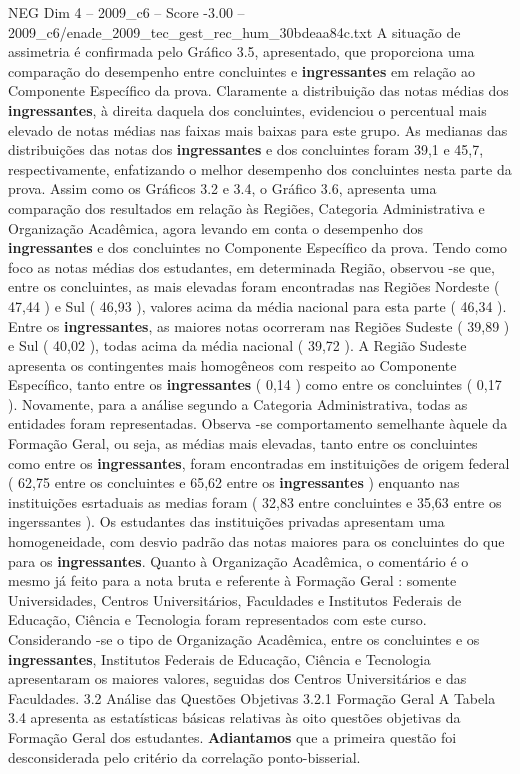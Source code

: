 \begin{textsample}{NEG Dim 4 – 2009\_c6 – Score -3.00 – 2009\_c6/enade\_2009\_tec\_gest\_rec\_hum\_30bdeaa84c.txt}
A situação de assimetria é confirmada pelo Gráfico 3.5, apresentado, que proporciona uma comparação do desempenho entre concluintes e \textbf{ingressantes} em relação ao Componente Específico da prova.
Claramente a distribuição das notas médias dos \textbf{ingressantes}, à direita daquela dos concluintes, evidenciou o percentual mais elevado de notas médias nas faixas mais baixas para este grupo.
As medianas das distribuições das notas dos \textbf{ingressantes} e dos concluintes foram 39,1 e 45,7, respectivamente, enfatizando o melhor desempenho dos concluintes nesta parte da prova.
Assim como os Gráficos 3.2 e 3.4, o Gráfico 3.6, apresenta uma comparação dos resultados em relação às Regiões, Categoria Administrativa e Organização Acadêmica, agora levando em conta o desempenho dos \textbf{ingressantes} e dos concluintes no Componente Específico da prova.
Tendo como foco as notas médias dos estudantes, em determinada Região, observou -se que, entre os concluintes, as mais elevadas foram encontradas nas Regiões Nordeste ( 47,44 ) e Sul ( 46,93 ), valores acima da média nacional para esta parte ( 46,34 ).
Entre os \textbf{ingressantes}, as maiores notas ocorreram nas Regiões Sudeste ( 39,89 ) e Sul ( 40,02 ), todas acima da média nacional ( 39,72 ).
A Região Sudeste apresenta os contingentes mais homogêneos com respeito ao Componente Específico, tanto entre os \textbf{ingressantes} ( 0,14 ) como entre os concluintes ( 0,17 ).
Novamente, para a análise segundo a Categoria Administrativa, todas as entidades foram representadas.
Observa -se comportamento semelhante àquele da Formação Geral, ou seja, as médias mais elevadas, tanto entre os concluintes como entre os \textbf{ingressantes}, foram encontradas em instituições de origem federal ( 62,75 entre os concluintes e 65,62 entre os \textbf{ingressantes} ) enquanto nas instituições esrtaduais as medias foram ( 32,83 entre concluintes e 35,63 entre os ingerssantes ).
Os estudantes das instituições privadas apresentam uma homogeneidade, com desvio padrão das notas maiores para os concluintes do que para os \textbf{ingressantes}.
Quanto à Organização Acadêmica, o comentário é o mesmo já feito para a nota bruta e referente à Formação Geral : somente Universidades, Centros Universitários, Faculdades e Institutos Federais de Educação, Ciência e Tecnologia foram representados com este curso.
Considerando -se o tipo de Organização Acadêmica, entre os concluintes e os \textbf{ingressantes}, Institutos Federais de Educação, Ciência e Tecnologia apresentaram os maiores valores, seguidas dos Centros Universitários e das Faculdades. 3.2 Análise das Questões Objetivas 3.2.1 Formação Geral A Tabela 3.4 apresenta as estatísticas básicas relativas às oito questões objetivas da Formação Geral dos estudantes. \textbf{Adiantamos} que a primeira questão foi desconsiderada pelo critério da correlação ponto-bisserial.

\end{textsample}
